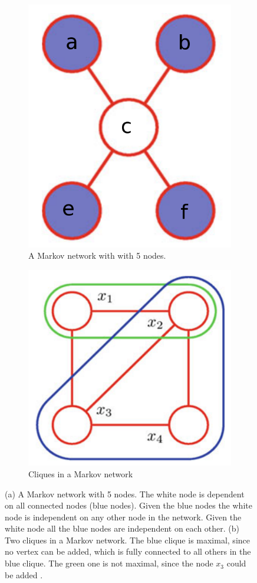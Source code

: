\begin{figure}
	\centering
	\begin{subfigure}[t]{.5\textwidth}
  		\centering
  		\includegraphics[width=.5\linewidth]{imgs/markovnet1.png}
  		\caption{A Markov network with with 5 nodes.}
  		\label{fig:markovnet1}
	\end{subfigure}%
	\begin{subfigure}[t]{.5\textwidth}
  		\centering
  		\includegraphics[width=.5\linewidth]{imgs/markovnet2.png}
  		\caption{Cliques in a Markov network}
  		\label{fig:markovnet2}
	\end{subfigure}
	\caption{(a) A Markov network with 5 nodes. The white node is dependent on all connected nodes (blue nodes). Given the blue nodes the white node is independent on any other node in the network. Given the white node all the blue nodes are independent on each other. (b) Two cliques in a Markov network. The blue clique is maximal, since no vertex can be added, which is fully connected to all others in the blue clique. The green one is not maximal, since the node $x_3$ could be added \cite{bishop2013pattern}.}
	\label{fig:markovnet}
\end{figure}


